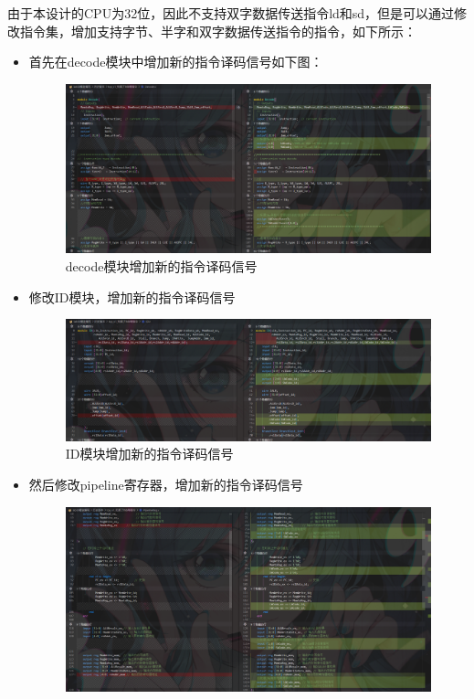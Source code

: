 \documentclass[12pt,hyperref,a4paper,UTF8]{ctexart}
\begin{document}
由于本设计的CPU为32位，因此不支持双字数据传送指令ld和sd，但是可以通过修改指令集，增加支持字节、半字和双字数据传送指令的指令，如下所示：

\begin{itemize}
    \item 首先在decode模块中增加新的指令译码信号如下图：
    \begin{figure}[H]
        \centering
        \includegraphics[width=1\textwidth]{figures/fig/image19.png}
        \caption{decode模块增加新的指令译码信号}
    \end{figure}
    \item 修改ID模块，增加新的指令译码信号
        \begin{figure}[H]
        \centering
        \includegraphics[width=1\textwidth]{figures/fig/image20.png}
        \caption{ID模块增加新的指令译码信号}
    \end{figure}
    \item 然后修改pipeline寄存器，增加新的指令译码信号
    \begin{figure}[H]
        \centering
        \includegraphics[width=1\textwidth]{figures/fig/image22.png}

\end{figure}
\end{itemize}
\end{document}
